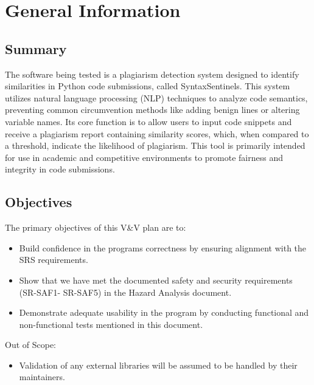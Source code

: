 \documentclass[12pt, titlepage]{article}
\begin{document}
\section{General Information}

\subsection{Summary}

  The software being tested is a plagiarism detection system designed to identify similarities in Python code submissions, called SyntaxSentinels. 
  This system utilizes natural language processing (NLP) techniques to analyze code semantics, preventing common circumvention methods 
  like adding benign lines or altering variable names. Its core function is to allow users to input code snippets and receive a plagiarism 
  report containing similarity scores, which, when compared to a threshold, indicate the likelihood of plagiarism. This tool is primarily 
  intended for use in academic and competitive environments to promote fairness and integrity in code submissions.

\subsection{Objectives}

The primary objectives of this V\&V plan are to:
\begin{itemize}
  \item Build confidence in the programs correctness by ensuring alignment with the SRS requirements.
  \item Show that we have met the documented safety and security requirements (SR-SAF1- SR-SAF5) in the Hazard Analysis document.
  \item Demonstrate adequate usability in the program by conducting functional and non-functional tests mentioned in this document.
\end{itemize}

Out of Scope:
\begin{itemize}
  \item Validation of any external libraries will be assumed to be handled by their maintainers.
\end{itemize}
\end{document}
